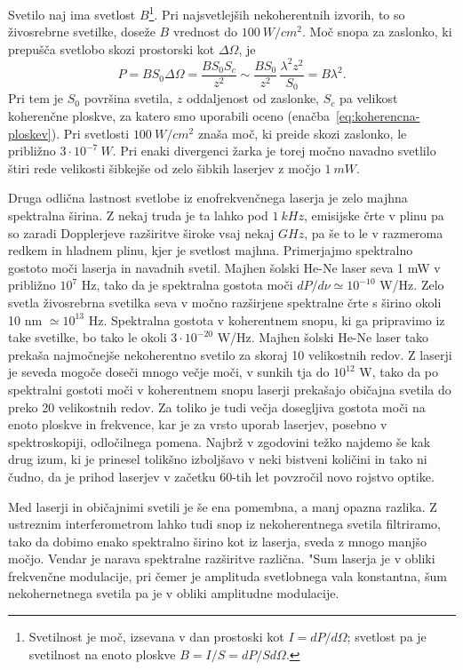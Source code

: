 Svetilo naj ima svetlost $B$\footnote{Svetilnost je moč, izsevana v dan 
prostoski kot $I = dP/d\Omega$; svetlost pa je svetilnost na enoto ploskve
$B=I/S = dP/Sd\Omega$.}. Pri najsvetlejših nekoherentnih izvorih, 
to so živosrebrne svetilke, doseže $B$ vrednost do $100~\si{W/cm^{2}}$. 
Moč snopa za zaslonko, ki prepušča svetlobo skozi prostorski kot $\Delta\Omega$, 
je
\begin{equation}
P=BS_{0}\Delta \Omega =\frac{BS_{0}S_{c}}{z^{2}}\sim \frac{BS_{0}}{z^{2}}\,
\frac{\lambda ^{2}z^{2}}{S_{0}}=B\lambda ^{2}.
\label{5.21}
\end{equation}
Pri tem je $S_{0}$ površina svetila, $z$ oddaljenost od zaslonke, 
$S_{c}$ pa velikost koherenčne ploskve, za katero smo uporabili oceno 
(enačba~\ref{eq:koherencna-ploskev}). Pri svetlosti $100~\si{W/cm^{2}}$ 
znaša moč, ki preide skozi zaslonko, le približno $3\cdot10^{-7}~\si{W}$.
Pri enaki divergenci žarka je torej močno navadno svetlilo štiri rede
velikosti šibkejše od zelo šibkih laserjev z močjo $1~\si{mW}$. 

Druga odlična lastnost svetlobe iz enofrekvenčnega laserja je zelo majhna
spektralna širina. Z nekaj truda je ta lahko pod $1~\si{kHz}$, emisijske 
črte v plinu pa so zaradi Dopplerjeve razširitve široke vsaj nekaj $\si{GHz}$, 
pa še to le v razmeroma redkem in hladnem plinu, kjer je svetlost majhna.
Primerjajmo spektralno gostoto moči laserja in navadnih svetil. Majhen šolski He-Ne
laser seva 1 mW v približno $10^{7}$ Hz, tako da je spektralna gostota
moči $dP/d\nu \simeq 10^{-10}$ W/Hz. Zelo svetla živosrebrna svetilka
seva v močno razširjene spektralne črte s širino okoli 10 nm $\simeq
10^{13}$ Hz. Spektralna gostota v koherentnem snopu, ki ga pripravimo iz
take svetilke, bo tako le okoli $3\cdot 10^{-20}$ W/Hz. Majhen šolski
He-Ne laser tako prekaša najmočnejše nekoherentno svetilo za skoraj 10
velikostnih redov. Z laserji je seveda mogoče doseči mnogo večje
moči, v sunkih tja do $10^{12}$ W, tako da po spektralni gostoti moči v
koherentnem snopu laserji prekašajo običajna svetila do preko 20
velikostnih redov. Za toliko je tudi večja dosegljiva gostota moči na
enoto ploskve in frekvence, kar je za vrsto uporab laserjev, posebno v
spektroskopiji, odločilnega pomena. Najbrž v zgodovini težko najdemo
še kak drug izum, ki je prinesel tolikšno izboljšavo v neki bistveni
količini in tako ni čudno, da je prihod laserjev v začetku 60-tih let
povzročil novo rojstvo optike.

Med laserji in običajnimi svetili je še ena pomembna, a manj opazna
razlika. Z ustreznim interferometrom lahko tudi snop iz nekoherentnega
svetila filtriramo, tako da dobimo enako spektralno širino kot iz laserja,
sveda z mnogo manjšo močjo. Vendar je narava spektralne razširitve
različna. "Sum laserja je v obliki frekvenčne modulacije, pri čemer je
amplituda svetlobnega vala konstantna, šum nekohernetnega svetila pa je v
obliki amplitudne modulacije.

